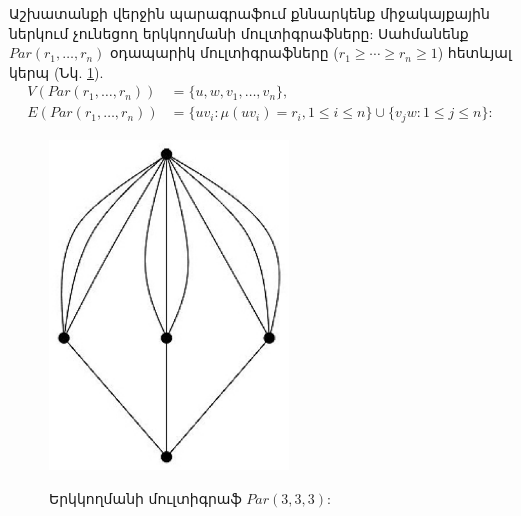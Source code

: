Աշխատանքի վերջին պարագրաֆում քննարկենք միջակայքային ներկում չունեցող երկկողմանի մուլտիգրաֆները: Սահմանենք  $Par(r_{1},\ldots,r_{n})$ օդապարիկ մուլտիգրաֆները ($r_{1}\geq\cdots\geq r_{n}\geq 1$) հետևյալ կերպ (Նկ. \ref{f3_parachute}).
\begin{align*}
V(Par(r_{1},\ldots,r_{n}))&=\{u,w,v_{1},\ldots,v_{n}\}, \\
E(Par(r_{1},\ldots,r_{n}))&=\{uv_{i}:\mu(uv_{i})=r_{i},1\leq i\leq
n\}\cup \{v_{j}w:1\leq j\leq n\}:
\end{align*}

\begin{figure}[h]
\begin{center}
\includegraphics[width=15pc]{figures/parachute.eps}\\
\caption{Երկկողմանի մուլտիգրաֆ $Par(3,3,3)$:}\label{f3_parachute}
\end{center}
\end{figure}

